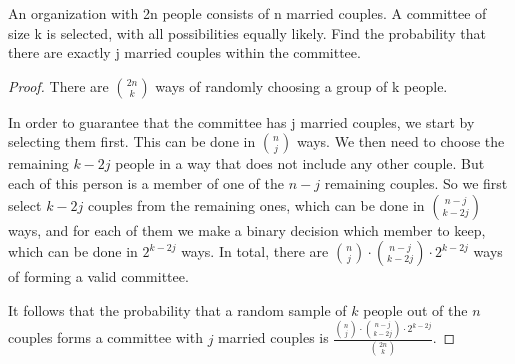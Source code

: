 \begin{exercise}{37}
An organization with 2n people consists of n married couples. A committee of size k is selected, with all possibilities equally likely. Find the probability that there are exactly j married couples within the committee.
\end{exercise}

\begin{proof}
    There are ${2n \choose k}$ ways of randomly choosing a group of k people.

    In order to guarantee that the committee has j married couples, we start by selecting them first. This can be done in ${n \choose j}$ ways. We then need to choose the remaining $k-2j$ people in a way that does not include any other couple. But each of this person is a member of one of the $n-j$ remaining couples. So we first select $k-2j$ couples from the remaining ones, which can be done in ${ {n-j} \choose {k-2j}}$ ways, and for each of them we make a binary decision which member to keep, which can be done in $2^{k-2j}$ ways. In total, there are ${n \choose j} \cdot { {n-j} \choose {k-2j}} \cdot 2^{k-2j}$ ways of forming a valid committee.

    It follows that the probability that a random sample of $k$ people out of the $n$ couples forms a committee with $j$ married couples is $\frac{ {n \choose j} \cdot { {n-j} \choose {k-2j}} \cdot 2^{k-2j}}{ {2n \choose k}}$.
    

\end{proof}



